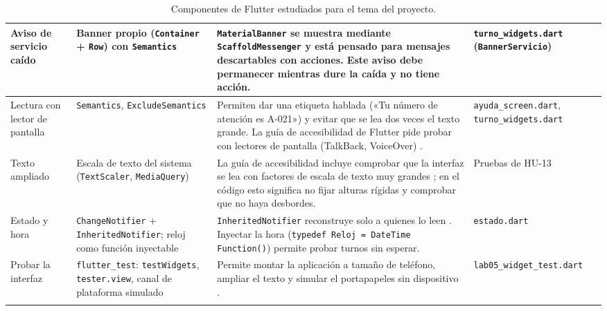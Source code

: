 \begin{longtable}{|p{2.5cm}|p{3.3cm}|p{4.5cm}|p{3.5cm}|}
	Aviso de servicio caído & Banner propio (\texttt{Container} + \texttt{Row}) con \texttt{Semantics} & \texttt{MaterialBanner} se muestra mediante \texttt{ScaffoldMessenger} y está pensado para mensajes descartables con acciones. Este aviso debe permanecer mientras dure la caída y no tiene acción. & \texttt{turno\_widgets.dart} (\texttt{BannerServicio}) \\\hline
	Lectura con lector de pantalla & \texttt{Semantics}, \texttt{ExcludeSemantics} & Permiten dar una etiqueta hablada («Tu número de atención es A-021») y evitar que se lea dos veces el texto grande. La guía de accesibilidad de Flutter pide probar con lectores de pantalla (TalkBack, VoiceOver) \cite{flutteracc}. & \texttt{ayuda\_screen.dart}, \texttt{turno\_widgets.dart} \\\hline
	Texto ampliado & Escala de texto del sistema (\texttt{TextScaler}, \texttt{MediaQuery}) & La guía de accesibilidad incluye comprobar que la interfaz se lea con factores de escala de texto muy grandes \cite{flutteracc}; en el código esto significa no fijar alturas rígidas y comprobar que no haya desbordes. & Pruebas de HU-13 \\\hline
	Estado y hora & \texttt{ChangeNotifier} + \texttt{InheritedNotifier}; reloj como función inyectable & \texttt{InheritedNotifier} reconstruye solo a quienes lo leen \cite{flutterinherited}. Inyectar la hora (\texttt{typedef Reloj = DateTime Function()}) permite probar turnos sin esperar. & \texttt{estado.dart} \\\hline
	Probar la interfaz & \texttt{flutter\_test}: \texttt{testWidgets}, \texttt{tester.view}, canal de plataforma simulado & Permite montar la aplicación a tamaño de teléfono, ampliar el texto y simular el portapapeles sin dispositivo \cite{fluttertest}. & \texttt{lab05\_widget\_test.dart} \\\hline
	\caption{Componentes de Flutter estudiados para el tema del proyecto.}
	\label{tab:componentes}
\end{longtable}

